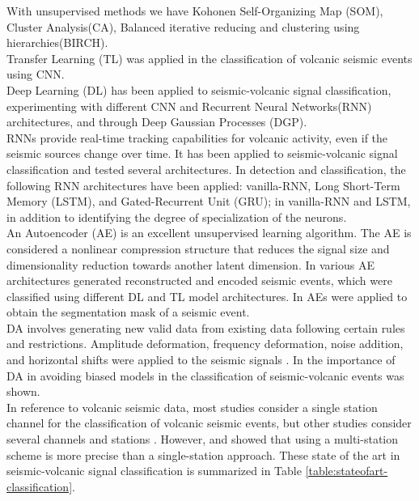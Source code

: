 \documentclass[journal]{IEEEtran}
\begin{document}
With unsupervised methods we have Kohonen Self-Organizing Map (SOM)\cite{langer2009synopsis,esposito2008unsupervised}, Cluster Analysis(CA)\cite{langer2009synopsis}, Balanced iterative reducing and clustering using hierarchies(BIRCH)\cite{duque2020exploring}. \\
Transfer Learning (TL) was applied in the classification of volcanic seismic events using CNN\cite{mythesismaster,titos2019classification}. \\
Deep Learning (DL) has been applied to seismic-volcanic signal classification, experimenting with different CNN\cite{mythesismaster} and Recurrent Neural Networks(RNN) architectures\cite{salazar2020deep,ferreira2023deep,canario2020indepth}, and through Deep Gaussian Processes (DGP)\cite{lopez2020acontribution}. \\
RNNs provide real-time tracking capabilities for volcanic activity, even if the seismic sources change over time. It has been applied to seismic-volcanic signal classification and tested several architectures\cite{salazar2020deep}. In detection and classification, the following RNN architectures have been applied: vanilla-RNN, Long Short-Term Memory (LSTM), and Gated-Recurrent Unit (GRU)\cite{titos2018detection}; in \cite{rodriguez2021bayesian} vanilla-RNN and LSTM, in addition to identifying the degree of specialization of the neurons. \\
An Autoencoder (AE) is an excellent unsupervised learning algorithm. The AE is considered a nonlinear compression structure that reduces the signal size and dimensionality reduction towards another latent dimension. In \cite{mythesismaster} various AE architectures generated reconstructed and encoded seismic events, which were classified using different DL and TL model architectures. In \cite{rodriguez2021bayesian} AEs were applied to obtain the segmentation mask of a seismic event. \\
DA involves generating new valid data from existing data following certain rules and restrictions. Amplitude deformation, frequency deformation, noise addition, and horizontal shifts were applied to the seismic signals \cite{curilem2018using}. In \cite{salazar2022multi} the importance of DA in avoiding biased models in the classification of seismic-volcanic events was shown. \\
In reference to volcanic seismic data, most studies consider a single station channel for the classification of volcanic seismic events, but other studies consider several channels and stations \cite{lara2020automatic,curilem2016pattern,maggi2017implementation,ferreira2023deep}. However, \cite{titos2019classification} and \cite{ferreira2023deep} showed that using a multi-station scheme is more precise than a single-station approach. These state of the art in seismic-volcanic signal classification is summarized in Table \ref{table:stateofart-classification}.
\end{document}
